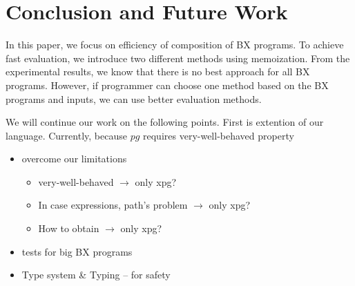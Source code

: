 \section{Conclusion and Future Work}

In this paper, we focus on efficiency of composition of BX programs.
To achieve fast evaluation, we introduce two different methods using memoization.
From the experimental results, we know that there is no best approach for all BX programs. However, if programmer can choose one method based on the BX programs and inputs, we can use better evaluation methods.

We will continue our work on the following points. First is extention of our language. Currently, because $pg$ requires very-well-behaved property



\begin{itemize}
\item overcome our limitations
  \begin{itemize}
  \item very-well-behaved $\to$ only xpg?
  \item In case expressions, path's problem $\to$ only xpg?
  \item How to obtain $\to$ only xpg?
  \end{itemize}
  \item tests for big BX programs
\item Type system \& Typing -- for safety
\end{itemize}






